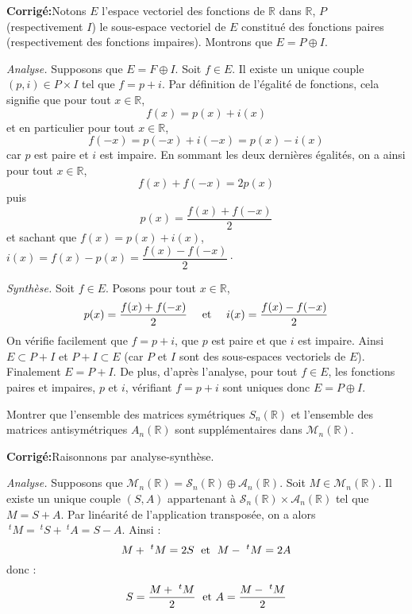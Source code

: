 \documentclass[a4paper,twoside,french,10pt]{VcCours}
\newcommand{\corr}{\textbf{Corrigé:}}
\begin{document}
\corr Notons $E$ l'espace vectoriel des fonctions de $\mathbb{R}$ dans $\mathbb{R}$, $P$ (respectivement $I$) le sous-espace vectoriel de $E$ constitué des fonctions paires (respectivement des fonctions impaires). Montrons que $E= P \oplus I$.

\medskip

\textit{Analyse.} Supposons que $E= F \oplus I$. Soit $f \in E$. Il existe un unique couple $(p,i) \in P \times I$ tel que $f=p + i$. Par définition de l'égalité de fonctions, cela signifie que pour tout $x \in \mathbb{R}$,
$$ f(x) = p(x)+i(x)$$
et en particulier pour tout $x \in \mathbb{R}$,
$$ f(-x) = p(-x)+i(-x) = p(x)-i(x)$$
car $p$ est paire et $i$ est impaire. En sommant les deux dernières égalités, on a ainsi pour tout $x \in \mathbb{R}$,
$$ f(x)+f(-x) = 2p(x) $$
puis
$$ p(x) = \frac{f(x)+f(-x)}{2}$$
et sachant que $f(x)=p(x)+i(x)$, $i(x)=f(x)-p(x) = \dfrac{f(x)-f(-x)}{2}\cdot$

\medskip

\textit{Synthèse.} Soit $f \in E$. Posons pour tout $x \in \mathbb{R}$,
$$ p(x) = \frac{f(x)+f(-x)}{2} \quad \hbox{ et } \quad i(x) = \frac{f(x)-f(-x)}{2} $$
On vérifie facilement que $f=p+i$, que $p$ est paire et que $i$ est impaire. Ainsi $E \subset P + I$ et $P + I \subset E$ (car $P$ et $I$ sont des sous-espaces vectoriels de $E$). Finalement $E=P+I$. De plus, d'après l'analyse, pour tout $f \in E$, les fonctions paires et impaires, $p$ et $i$, vérifiant $f=p+i$ sont uniques donc $E = P \oplus I$.

\medskip

\begin{Exercice}{} Montrer que l'ensemble des matrices symétriques $S_n(\mathbb{R})$ et l'ensemble des matrices antisymétriques $A_n(\mathbb{R})$ sont supplémentaires dans $\mathcal{M}_n(\mathbb{R})$.
\end{Exercice}

\corr Raisonnons par analyse-synthèse.

\medskip

\textit{Analyse.} Supposons que $\mathcal{M}_n(\mathbb{R})= \mathcal{S}_n(\mathbb{R}) \oplus \mathcal{A}_n(\mathbb{R})$. Soit $M \in \mathcal{M}_n(\mathbb{R})$. Il existe un unique couple $(S,A)$ appartenant à  $\mathcal{S}_n(\mathbb{R}) \times \mathcal{A}_n(\mathbb{R})$ tel que $M=S+A$. Par linéarité de l'application transposée, on a alors $~^t M = ~^t S + ~^t A = S-A$. Ainsi :
$$ M + ~^t M = 2S \; \hbox{ et } \; M- ~^tM= 2A$$
donc :
$$ S = \dfrac{M + ~^t M}{2} \; \hbox{ et } A = \dfrac{M-~^tM}{2}$$
\end{document}
